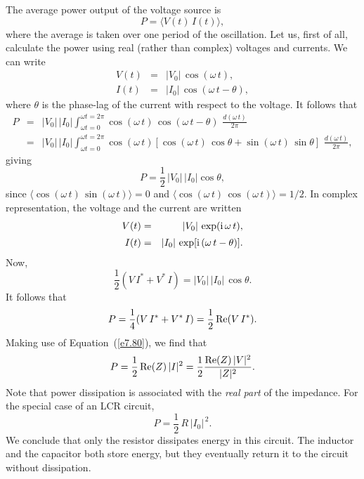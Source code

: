 The average power output of  the voltage source is
\begin{equation}
P = \langle  V(t) \,I(t) \rangle,
\end{equation}
where the average is taken over one period of the oscillation. Let us, first of all,
calculate the power using real (rather than complex)  voltages and currents.
We can write
\begin{eqnarray}
V(t) &=& |V_0|\, \cos(\omega\, t),\\[0.5ex] 
I(t) &=& |I_0| \,\cos(\omega\, t - \theta),
\end{eqnarray}
where $\theta$ is the phase-lag of the current with respect to the voltage.
It follows that
\begin{eqnarray}
P& = &|V_0|\, |I_0| \int_{\omega t = 0}^{\omega t = 2\pi}
\cos(\omega\, t)\, \cos(\omega\, t - \theta)\,\,\frac{d(\omega \,t)}{2\pi}\\[0.5ex]
&=& |V_0|\, |I_0| \int_{\omega t =0}^{\omega t = 2\pi} 
\cos(\omega\, t) \left[\cos(\omega\, t)\, \cos\theta + \sin(\omega \,t) \,\sin \theta\right]\,\,
\frac{d(\omega\, t)}{2\pi},\nonumber
\end{eqnarray}
giving
\begin{equation}
P = \frac{1}{2}\, |V_0|\, |I_0| \cos\theta,
\end{equation}
since $\langle \cos(\omega\, t)\,\sin(\omega\, t)\rangle = 0$ and $\langle \cos(\omega\, t) \,\cos(\omega \,t)\rangle = 1/2$. 
In complex representation, the voltage and the current are written
\begin{eqnarray}
V(t) &=& |V_0| \,\exp({\rm i}\,\omega\,t),\\[0.5ex] 
I(t) &=& |I_0|\, \exp[{\rm i}\,(\omega \,t - \theta)].
\end{eqnarray}
Now,
\begin{equation}
\frac{1}{2} ( V\, I^\ast +V^\ast\, I)=
|V_0|\, |I_0|\, \cos\theta.
\end{equation}
It follows that
\begin{equation}
P = \frac{1}{4} ( V\, I^\ast + V^\ast \,I) = \frac{1}{2}\, {\rm Re}(V \,I^\ast).
\end{equation}
Making use of Equation~(\ref{e7.80}), we find that
\begin{equation}
P = \frac{1}{2} \,{\rm Re}(Z)\, |I|^2 = \frac{1}{2} \frac{{\rm Re}(Z)\,|V|^2}{|Z|^2}.
\end{equation}
Note that power dissipation is associated with the {\em real part} of the impedance.
For the special case of an LCR circuit, 
\begin{equation}
P = \frac{1}{2} \,R \,|I_0|^{\,2}.
\end{equation}
We conclude that only the resistor dissipates energy in this circuit. The inductor and
the capacitor both store energy, but they eventually return it to the circuit
without dissipation. 

